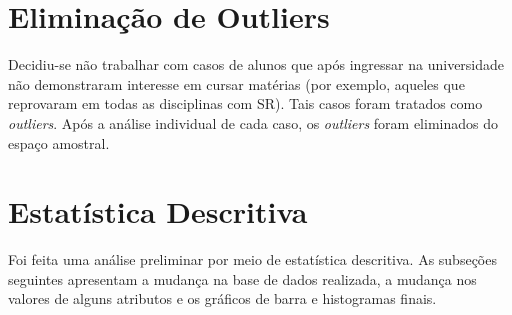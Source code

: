 \section{Eliminação de Outliers}
Decidiu-se não trabalhar com casos de alunos que após ingressar na universidade não
demonstraram interesse em cursar matérias (por exemplo, aqueles que reprovaram em
todas as disciplinas com SR). Tais casos foram tratados como \textit{outliers}.
Após a análise individual de cada caso, os \textit{outliers} foram eliminados do espaço
amostral.

\section{Estatística Descritiva}
Foi feita uma análise preliminar por meio de estatística descritiva. As subseções
seguintes apresentam a mudança na base de dados realizada, a mudança nos valores de
alguns atributos e os gráficos de barra e histogramas finais. 
